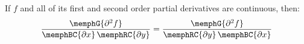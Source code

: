 \begin{multicols}{2}
\begin{CheatsheetEntryFrame}
        If $f$ and all of its first and second order partial derivatives are continuous, then:
        \newcommand{\DsqFun}{\memphG{\partial^2{f}}}
        \newcommand{\DX}{\memphBC{\partial{x}}}
        \newcommand{\DY}{\memphRC{\partial{y}}}
        \begin{equation*}
            \frac{\DsqFun}{\DX \, \DY}
            = \frac{\DsqFun}{\DY \, \DX}
        \end{equation*}


    \end{CheatsheetEntryFrame}
    
\end{multicols}

